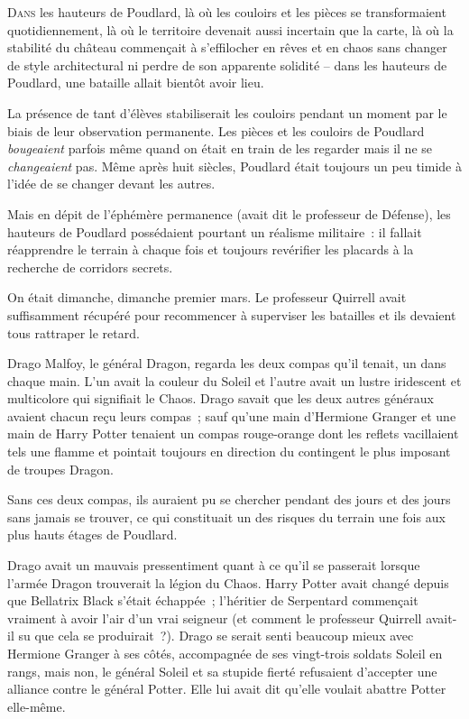 
\lettrine{D}{ans} les hauteurs de Poudlard, là où les couloirs et les pièces se transformaient quotidiennement, là où le territoire devenait aussi incertain que la carte, là où la stabilité du château commençait à s'effilocher en rêves et en chaos sans changer de style architectural ni perdre de son apparente solidité -- dans les hauteurs de Poudlard, une bataille allait bientôt avoir lieu.

La présence de tant d'élèves stabiliserait les couloirs pendant un moment par le biais de leur observation permanente. Les pièces et les couloirs de Poudlard \emph{bougeaient} parfois même quand on était en train de les regarder mais il ne se \emph{changeaient} pas. Même après huit siècles, Poudlard était toujours un peu timide à l'idée de se changer devant les autres.

Mais en dépit de l'éphémère permanence (avait dit le professeur de Défense), les hauteurs de Poudlard possédaient pourtant un réalisme militaire~: il fallait réapprendre le terrain à chaque fois et toujours revérifier les placards à la recherche de corridors secrets.

On était dimanche, dimanche premier mars. Le professeur Quirrell avait suffisamment récupéré pour recommencer à superviser les batailles et ils devaient tous rattraper le retard.

Drago Malfoy, le général Dragon, regarda les deux compas qu'il tenait, un dans chaque main. L'un avait la couleur du Soleil et l'autre avait un lustre iridescent et multicolore qui signifiait le Chaos. Drago savait que les deux autres généraux avaient chacun reçu leurs compas~; sauf qu'une main d'Hermione Granger et une main de Harry Potter tenaient un compas rouge-orange dont les reflets vacillaient tels une flamme et pointait toujours en direction du contingent le plus imposant de troupes Dragon.

Sans ces deux compas, ils auraient pu se chercher pendant des jours et des jours sans jamais se trouver, ce qui constituait un des risques du terrain une fois aux plus hauts étages de Poudlard.

Drago avait un mauvais pressentiment quant à ce qu'il se passerait lorsque l'armée Dragon trouverait la légion du Chaos. Harry Potter avait changé depuis que Bellatrix Black s'était échappée~; l'héritier de Serpentard commençait vraiment à avoir l'air d'un vrai seigneur (et comment le professeur Quirrell avait-il su que cela se produirait~?). Drago se serait senti beaucoup mieux avec Hermione Granger à ses côtés, accompagnée de ses vingt-trois soldats Soleil en rangs, mais non, le général Soleil et sa stupide fierté refusaient d'accepter une alliance contre le général Potter. Elle lui avait dit qu'elle voulait abattre Potter elle-même.

